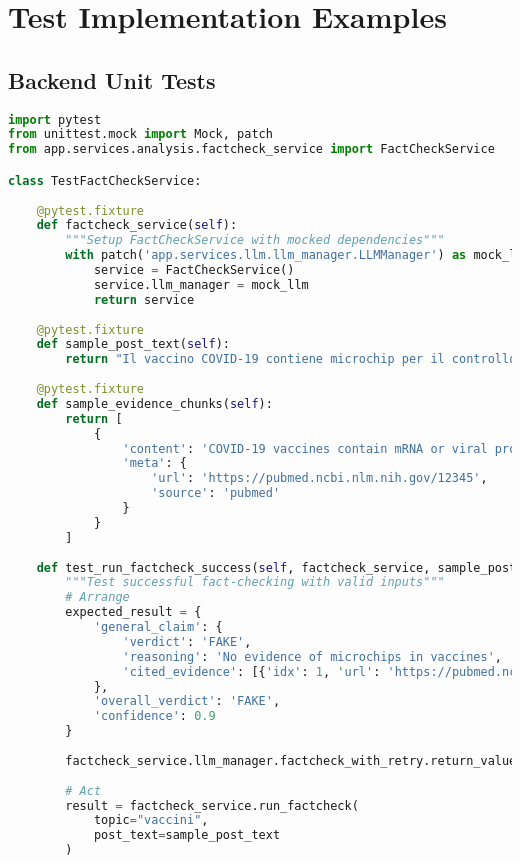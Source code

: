 \documentclass[12pt,a4paper]{report}
\begin{document}
\section{Test Implementation Examples}

\subsection{Backend Unit Tests}

\begin{lstlisting}[language=python, caption=Example Unit Tests - FactCheck Service]
import pytest
from unittest.mock import Mock, patch
from app.services.analysis.factcheck_service import FactCheckService

class TestFactCheckService:
    
    @pytest.fixture
    def factcheck_service(self):
        """Setup FactCheckService with mocked dependencies"""
        with patch('app.services.llm.llm_manager.LLMManager') as mock_llm:
            service = FactCheckService()
            service.llm_manager = mock_llm
            return service
    
    @pytest.fixture
    def sample_post_text(self):
        return "Il vaccino COVID-19 contiene microchip per il controllo mentale"
    
    @pytest.fixture
    def sample_evidence_chunks(self):
        return [
            {
                'content': 'COVID-19 vaccines contain mRNA or viral proteins, not microchips',
                'meta': {
                    'url': 'https://pubmed.ncbi.nlm.nih.gov/12345',
                    'source': 'pubmed'
                }
            }
        ]
    
    def test_run_factcheck_success(self, factcheck_service, sample_post_text, sample_evidence_chunks):
        """Test successful fact-checking with valid inputs"""
        # Arrange
        expected_result = {
            'general_claim': {
                'verdict': 'FAKE',
                'reasoning': 'No evidence of microchips in vaccines',
                'cited_evidence': [{'idx': 1, 'url': 'https://pubmed.ncbi.nlm.nih.gov/12345'}]
            },
            'overall_verdict': 'FAKE',
            'confidence': 0.9
        }
        
        factcheck_service.llm_manager.factcheck_with_retry.return_value = expected_result
        
        # Act
        result = factcheck_service.run_factcheck(
            topic="vaccini",
            post_text=sample_post_text
        )
        

\end{lstlisting}
\end{document}

